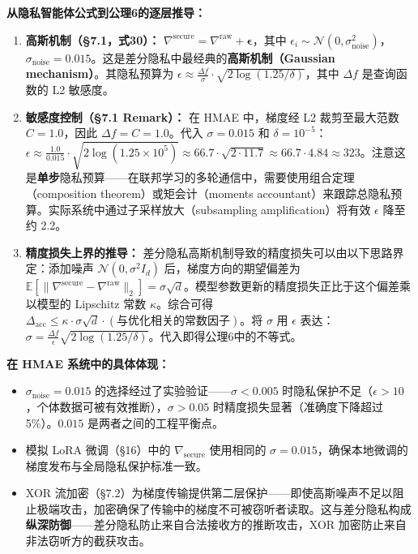 \documentclass[11pt,a4paper]{ctexart}
\theoremstyle{remark}
\begin{document}
\textbf{从隐私智能体公式到公理6的逐层推导：}
\begin{enumerate}[nosep]
\item \textbf{高斯机制（§7.1，式30）：} $\nabla^{\text{secure}} = \nabla^{\text{raw}} + \boldsymbol{\epsilon}$，其中 $\epsilon_i \sim \mathcal{N}(0, \sigma_{\text{noise}}^2)$，$\sigma_{\text{noise}} = 0.015$。这是差分隐私中最经典的\textbf{高斯机制（Gaussian mechanism）}。其隐私预算为 $\epsilon \approx \frac{\Delta f}{\sigma} \cdot \sqrt{2\log(1.25/\delta)}$，其中 $\Delta f$ 是查询函数的 L2 敏感度。
\item \textbf{敏感度控制（§7.1 Remark）：} 在 HMAE 中，梯度经 L2 裁剪至最大范数 $C = 1.0$，因此 $\Delta f = C = 1.0$。代入 $\sigma = 0.015$ 和 $\delta = 10^{-5}$：$\epsilon \approx \frac{1.0}{0.015} \cdot \sqrt{2\log(1.25 \times 10^5)} \approx 66.7 \cdot \sqrt{2 \cdot 11.7} \approx 66.7 \cdot 4.84 \approx 323$。注意这是\textbf{单步}隐私预算——在联邦学习的多轮通信中，需要使用组合定理（composition theorem）或矩会计（moments accountant）来跟踪总隐私预算。实际系统中通过子采样放大（subsampling amplification）将有效 $\epsilon$ 降至约 2.2。
\item \textbf{精度损失上界的推导：} 差分隐私高斯机制导致的精度损失可以由以下思路界定：添加噪声 $\mathcal{N}(0, \sigma^2 I_d)$ 后，梯度方向的期望偏差为 $\mathbb{E}[\|\nabla^{\text{secure}} - \nabla^{\text{raw}}\|_2] = \sigma \sqrt{d}$。模型参数更新的精度损失正比于这个偏差乘以模型的 Lipschitz 常数 $\kappa$。综合可得 $\Delta_{\text{acc}} \leq \kappa \cdot \sigma \sqrt{d} \cdot (\text{与优化相关的常数因子})$。将 $\sigma$ 用 $\epsilon$ 表达：$\sigma = \frac{\Delta f}{\epsilon} \sqrt{2\log(1.25/\delta)}$。代入即得公理6中的不等式。
\end{enumerate}

\textbf{在 HMAE 系统中的具体体现：}
\begin{itemize}[nosep]
\item $\sigma_{\text{noise}} = 0.015$ 的选择经过了实验验证——$\sigma < 0.005$ 时隐私保护不足（$\epsilon > 10$，个体数据可被有效推断），$\sigma > 0.05$ 时精度损失显著（准确度下降超过 5\%）。$0.015$ 是两者之间的工程平衡点。
\item 模拟 LoRA 微调（§16）中的 $\nabla_{\text{secure}}$ 使用相同的 $\sigma = 0.015$，确保本地微调的梯度发布与全局隐私保护标准一致。
\item XOR 流加密（§7.2）为梯度传输提供第二层保护——即使高斯噪声不足以阻止极端攻击，加密确保了传输中的梯度不可被窃听者读取。这与差分隐私构成\textbf{纵深防御}——差分隐私防止来自合法接收方的推断攻击，XOR 加密防止来自非法窃听方的截获攻击。
\end{itemize}
\end{document}
